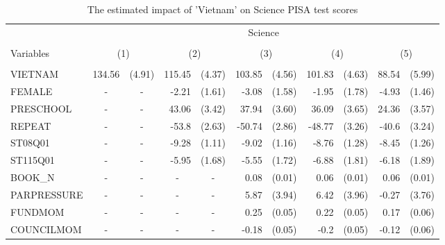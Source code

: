 \documentclass[10pt]{article}
\begin{document}
	\begin{table}[htbp]
		\footnotesize
		\def\arraystretch{1}
		\def\tabcolsep{4}
		\centering
		\caption{The estimated impact of 'Vietnam' on Science PISA test scores}
     \begin{tabular}{lrlrlrlrlrl}
     	\toprule
     	\midrule
     	& \multicolumn{10}{c}{Science} \\
		\cline{2-11} \\
     	Variables & \multicolumn{2}{c}{(1)} & \multicolumn{2}{c}{(2)} & \multicolumn{2}{c}{(3)} & \multicolumn{2}{c}{(4)} & \multicolumn{2}{c}{(5)} \\
     	\hline
     	&       &       &       &       &       &       &       &       &       &  \\
      VIETNAM & 134.56 & (4.91) & 115.45 & (4.37) & 103.85 & (4.56) & 101.83 & (4.63) & 88.54 & (5.99) \\[0.2em]
      FEMALE & \multicolumn{1}{c}{-} & \multicolumn{1}{c}{-} & -2.21 & (1.61) & -3.08 & (1.58) & -1.95 & (1.78) & -4.93 & (1.46) \\[0.2em]
      PRESCHOOL & \multicolumn{1}{c}{-} & \multicolumn{1}{c}{-} & 43.06 & (3.42) & 37.94 & (3.60) & 36.09 & (3.65) & 24.36 & (3.57) \\[0.2em]
      REPEAT & \multicolumn{1}{c}{-} & \multicolumn{1}{c}{-} & -53.8 & (2.63) & -50.74 & (2.86) & -48.77 & (3.26) & -40.6 & (3.24) \\[0.2em]
      ST08Q01 & \multicolumn{1}{c}{-} & \multicolumn{1}{c}{-} & -9.28 & (1.11) & -9.02 & (1.16) & -8.76 & (1.28) & -8.45 & (1.26) \\[0.2em]
      ST115Q01 & \multicolumn{1}{c}{-} & \multicolumn{1}{c}{-} & -5.95 & (1.68) & -5.55 & (1.72) & -6.88 & (1.81) & -6.18 & (1.89) \\[0.2em]
      BOOK\_N & \multicolumn{1}{c}{-} & \multicolumn{1}{c}{-} & \multicolumn{1}{c}{-} & \multicolumn{1}{c}{-} & 0.08  & (0.01) & 0.06  & (0.01) & 0.06  & (0.01) \\[0.2em]
      PARPRESSURE & \multicolumn{1}{c}{-} & \multicolumn{1}{c}{-} & \multicolumn{1}{c}{-} & \multicolumn{1}{c}{-} & 5.87  & (3.94) & 6.42  & (3.96) & -0.27 & (3.76) \\[0.2em]
      FUNDMOM & \multicolumn{1}{c}{-} & \multicolumn{1}{c}{-} & \multicolumn{1}{c}{-} & \multicolumn{1}{c}{-} & 0.25  & (0.05) & 0.22  & (0.05) & 0.17  & (0.06) \\[0.2em]
      COUNCILMOM & \multicolumn{1}{c}{-} & \multicolumn{1}{c}{-} & \multicolumn{1}{c}{-} & \multicolumn{1}{c}{-} & -0.18 & (0.05) & -0.2  & (0.05) & -0.12 & (0.06) \\[0.2em]

\end{tabular}
\end{table}
\end{document}
